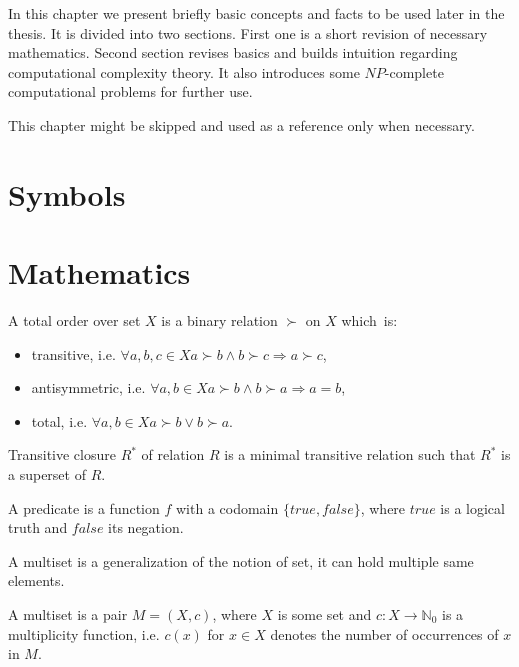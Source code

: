 In this chapter we present briefly basic concepts and facts to be used later in the thesis.
It is divided into two sections.
First one is a short revision of necessary mathematics.
Second section revises basics and builds intuition regarding computational complexity theory.
It also introduces some $NP$-complete computational problems for further use.

This chapter might be skipped and used as a reference only when necessary.

\section{Symbols}


\section{Mathematics}

\begin{defn}
A total order over set $X$ is a binary relation $\succ$ on $X$ which~is:
\begin{itemize}
	\item transitive, i.e. $\forall a,b,c \in X a \succ b \land b \succ c \Rightarrow a \succ c$,
	\item antisymmetric, i.e. $\forall a,b \in X a \succ b \land b \succ a \Rightarrow a=b $,
	\item total, i.e. $\forall a,b \in X a \succ b \lor b \succ a$.
\end{itemize}
\end{defn}

\begin{defn}
Transitive closure $R^*$ of relation $R$ is a minimal transitive relation 
such that $R^*$ is a superset of $R$.
\end{defn}

\begin{defn}[predicate]
A predicate is a function $f$ with a codomain $\{true, false\}$,
where $true$ is a logical truth and $false$ its negation.
\end{defn}

A multiset is a generalization of the notion of set, it can hold multiple same elements.

\begin{defn}[multiset]
A multiset is a pair $M = (X, c)$, where $X$ is some set and $c:X \rightarrow \mathbb{N}_0$
is a multiplicity function, i.e. $c(x)$ for $x \in X$ denotes the number of occurrences of $x$ in $M$.
\end{defn}

